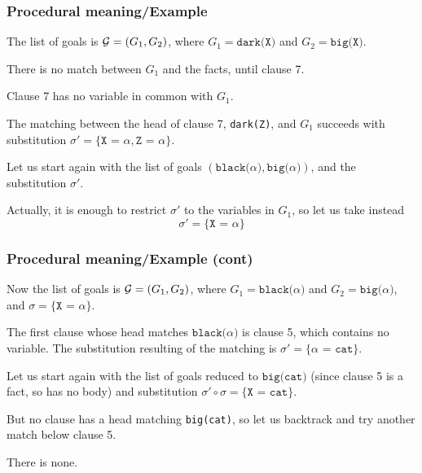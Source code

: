%
\begin{frame}
\frametitle{Procedural meaning/Example}

The list of goals is \({\cal G} = (G_1, G_2)\), where \(G_1 =
\texttt{dark(X)}\) and \(G_2 = \texttt{big(X)}\).

\bigskip

There is no match between \(G_1\) and the facts, until clause 7.

\bigskip

Clause 7 has no variable in common with \(G_1\).

\bigskip

The matching between the head of clause 7, \texttt{dark(Z)}, and
\(G_1\) succeeds with substitution \(\sigma' = \{\texttt{X = } \alpha,
\texttt{Z = } \alpha\}\).

\bigskip

Let us start again with the list of goals
\((\texttt{black(}\alpha\texttt{)}, \texttt{big(}\alpha\texttt{)})\),
and the substitution \(\sigma'\). 

\bigskip

Actually, it is enough to restrict \(\sigma'\) to the variables in
\(G_1\), so let us take instead \[\sigma' = \{\texttt{X = }
\alpha\}\]

\end{frame}

%
\begin{frame}
\frametitle{Procedural meaning/Example (cont)}

Now the list of goals is \({\cal G} = (G_1, G_2)\), where \(G_1 =
\texttt{black(}\alpha\texttt{)}\) and \(G_2 =
\texttt{big(}\alpha\texttt{)}\), and \(\sigma = \{\texttt{X = }
\alpha\}\).

\bigskip

The first clause whose head matches
\(\texttt{black(}\alpha\texttt{)}\) is clause 5, which contains no
variable. The substitution resulting of the matching is \(\sigma' =
\{\alpha \texttt{ = cat}\}\). 

\bigskip

Let us start again with the list of goals reduced to
\(\texttt{big(cat)}\) (since clause 5 is a fact, so has no body) and
substitution \(\sigma' \circ \sigma = \{\texttt{X = cat}\}\).

\bigskip

But no clause has a head matching \texttt{big(cat)}, so let us
backtrack and try another match below clause 5. 

\bigskip

There is none. 

\end{frame}

